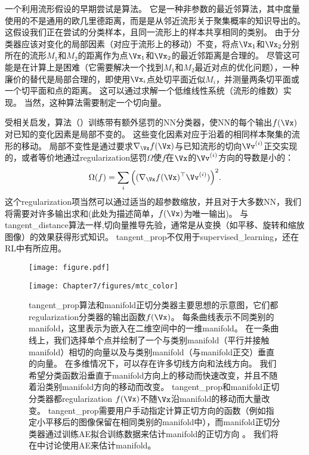 一个利用流形假设的早期尝试是算法\citep{Simard93-small,Simard98}。
它是一种非参数的最近邻算法，其中度量使用的不是通用的欧几里德距离，而是是从邻近流形关于聚集概率的知识导出的。
这假设我们正在尝试的分类样本，且同一流形上的样本共享相同的类别。
由于分类器应该对变化的局部因素（对应于流形上的移动）不变，将点$\Vx_1$和$\Vx_2$分别所在的流形$M_1$和$M_2$的距离作为点$\Vx_1$和$\Vx_2$的最近邻距离是合理的。
尽管这可能是在计算上是困难（它需要解决一个找到$M_1$和$M_2$最近对点的优化问题），一种廉价的替代是局部合理的，即使用$\Vx_i$点处切平面近似$M_i$，并测量两条切平面或一个切平面和点的距离。
这可以通过求解一个低维线性系统（流形的维数）实现。
当然，这种算法需要制定一个切向量。

受相关启发，算法\citep{Simard92-short}（）训练带有额外惩罚的\gls{NN}分类器，使\gls{NN}的每个输出$f(\Vx)$对已知的变化因素是局部不变的。
这些变化因素对应于沿着的相同样本聚集的流形的移动。
局部不变性是通过要求$\nabla_{\Vx} f(\Vx)$与已知流形的切向$\Vv^{(i)}$正交实现的，或者等价地通过\gls{regularization}惩罚$\Omega$使$f$在$\Vx$的$\Vv^{(i)}$方向的导数是小的：
\begin{align} \label{eq:767}
 \Omega(f) = \sum_i \Big((\nabla_{\Vx} f(\Vx)^\top \Vv^{(i)}) \Big)^2 .
\end{align}
这个\gls{regularization}项当然可以通过适当的超参数缩放，并且对于大多数\gls{NN}，我们将需要对许多输出求和(此处为描述简单，$f(\Vx)$为唯一输出)。
与\gls{tangent_distance}算法一样,切向量推导先验，通常是从变换（如平移、旋转和缩放图像）的效果获得形式知识。
\gls{tangent_prop}不仅用于\gls{supervised_learning}\citep{Simard92-short}，还在\gls{RL}\citep{Thrun-NIPS1994}中有所应用。
\begin{figure}[!htb]
\ifOpenSource
\centerline{\texttt{[image: figure.pdf]}}
\else
\centerline{\texttt{[image: Chapter7/figures/mtc\_color]}}
\fi
\caption{\gls{tangent_prop}算法\citep{Simard92-short}和\gls{manifold}正切分类器主要思想的示意图\citep{Dauphin-et-al-NIPS2011-small}，它们都\gls{regularization}分类器的输出函数$f(\Vx)$。
每条曲线表示不同类别的\gls{manifold}，这里表示为嵌入在二维空间中的一维\gls{manifold}。
在一条曲线上，我们选择单个点并绘制了一个与类别\gls{manifold}（平行并接触\gls{manifold}）相切的向量以及与类别\gls{manifold}（与\gls{manifold}正交）垂直的向量。
在多维情况下，可以存在许多切线方向和法线方向。
我们希望分类函数沿垂直于\gls{manifold}方向上的移动而快速改变，并且不随着沿类别\gls{manifold}方向的移动而改变。
\gls{tangent_prop}和\gls{manifold}正切分类器都\gls{regularization} $f(\Vx)$不随$\Vx$沿\gls{manifold}的移动而大量改变。
\gls{tangent_prop}需要用户手动指定计算正切方向的函数（例如指定小平移后的图像保留在相同类别的\gls{manifold}中），而\gls{manifold}正切分类器通过训练\gls{AE}拟合训练数据来估计\gls{manifold}的正切方向 。
我们将在中讨论使用\gls{AE}来估计\gls{manifold}。
}
\label{fig:chap7_mtc_color}
\end{figure}

